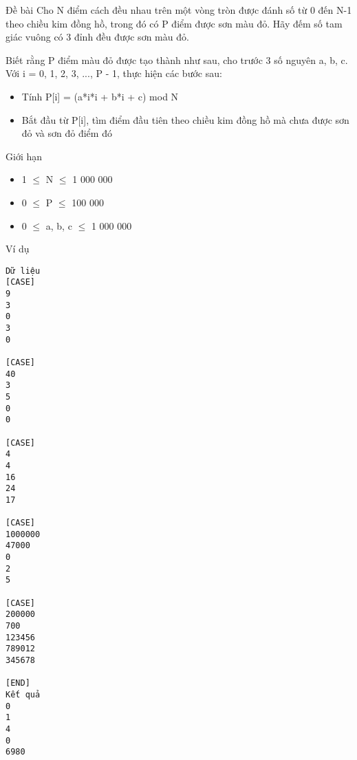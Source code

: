 Đề bài
Cho N điểm cách đều nhau trên một vòng tròn được đánh số từ 0 đến N-1 theo chiều kim đồng hồ, trong đó có P điểm được sơn màu đỏ. Hãy đếm số tam giác vuông có 3 đỉnh đều được sơn màu đỏ.  

   Biết rằng P điểm màu đỏ được tạo thành như sau, cho trước 3 số nguyên a, b, c. Với i = 0, 1, 2, 3, ..., P - 1, thực hiện các bước sau:  
\begin{itemize}
	\item     Tính P[i] = (a*i*i + b*i + c) mod N   
	\item     Bắt đầu từ P[i], tìm điểm đầu tiên theo chiều kim đồng hồ mà chưa được sơn đỏ và sơn đỏ điểm đó   
\end{itemize}
Giới hạn
\begin{itemize}
	\item     1  $\le$  N  $\le$  1 000 000   
	\item     0  $\le$  P  $\le$  100 000   
	\item     0  $\le$  a, b, c  $\le$  1 000 000   
\end{itemize}
Ví dụ
\begin{verbatim}
Dữ liệu
[CASE]
9
3
0
3
0

[CASE]
40
3
5
0
0

[CASE]
4
4
16
24
17
    	
[CASE]
1000000
47000
0
2
5

[CASE]
200000
700
123456
789012
345678

[END]
Kết quả
0
1
4
0
6980
\end{verbatim}